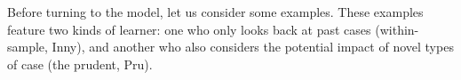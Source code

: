 \documentclass[12pt,a4paper,twoside]{article}
\newcommand{\gsii}{$\textup{GS03}$}
\begin{document}
%

Before turning to the model, let us consider some examples. These examples
feature two kinds of learner: one who only looks back at past cases
(within-sample, Inny), and another who also considers the potential impact of
novel types of case (the prudent, Pru).

% 
%  
%
\end{document}
